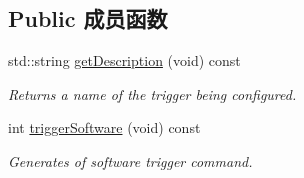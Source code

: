 \subsection*{Public 成员函数}
\begin{DoxyCompactItemize}
\item 
\hypertarget{classmv_i_m_p_a_c_t_1_1acquire_1_1_trigger_control_a1072aa0cf993cf5610a2bb91d2927f34}{std\+::string \hyperlink{classmv_i_m_p_a_c_t_1_1acquire_1_1_trigger_control_a1072aa0cf993cf5610a2bb91d2927f34}{get\+Description} (void) const }\label{classmv_i_m_p_a_c_t_1_1acquire_1_1_trigger_control_a1072aa0cf993cf5610a2bb91d2927f34}

\begin{DoxyCompactList}\small\item\em Returns a name of the trigger being configured. \end{DoxyCompactList}\item 
int \hyperlink{classmv_i_m_p_a_c_t_1_1acquire_1_1_trigger_control_ae96bff39192548c0d9f453d3b205b0ac}{trigger\+Software} (void) const 
\begin{DoxyCompactList}\small\item\em Generates of software trigger command. \end{DoxyCompactList}\end{DoxyCompactItemize}
